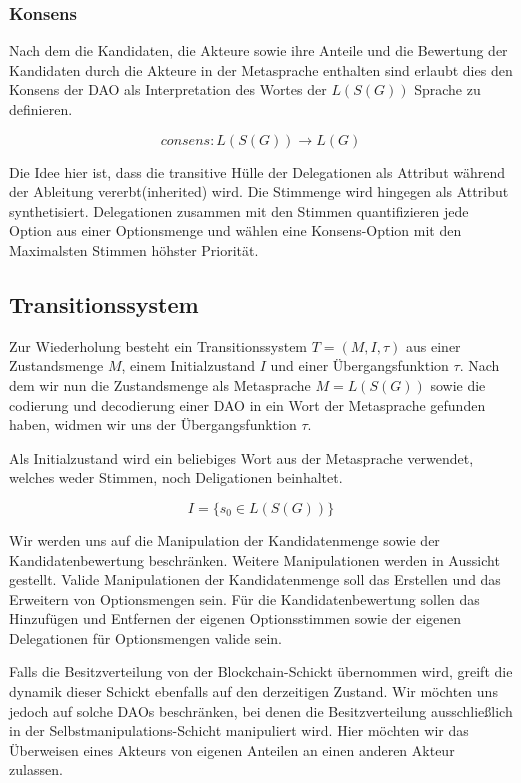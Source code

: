 \documentclass[a4paper,12pt]{article}
\begin{document}
\subsubsection*{Konsens}

Nach dem die Kandidaten, die Akteure sowie ihre Anteile und die Bewertung der Kandidaten durch die Akteure in der Metasprache enthalten sind erlaubt dies den Konsens der DAO als Interpretation des Wortes der $L(S(G))$ Sprache zu definieren. 

\[ consens: L(S(G)) \rightarrow L(G) \] 

Die Idee hier ist, dass die transitive Hülle der Delegationen als
Attribut während der Ableitung vererbt(inherited) wird. Die Stimmenge 
wird hingegen als Attribut synthetisiert.\cite{Knuth1968} Delegationen zusammen mit den Stimmen quantifizieren jede Option aus einer Optionsmenge und wählen
eine Konsens-Option mit den Maximalsten Stimmen höhster Priorität.



\subsection{Transitionssystem}

Zur Wiederholung besteht ein Transitionssystem $T=(M,I,\tau)$ aus einer Zustandsmenge $M$, einem Initialzustand $I$ und einer Übergangsfunktion $\tau$.
Nach dem wir nun die Zustandsmenge als Metasprache $M=L(S(G))$ sowie die codierung und decodierung einer DAO in ein Wort der Metasprache gefunden haben, widmen wir uns der Übergangsfunktion $\tau$.

Als Initialzustand wird ein beliebiges Wort aus der Metasprache verwendet, welches weder Stimmen, noch Deligationen beinhaltet.

\[ I = \{s_0\in L(S(G))\} \] 

Wir werden uns auf die Manipulation der Kandidatenmenge sowie der Kandidatenbewertung beschränken. Weitere Manipulationen werden in Aussicht gestellt. Valide Manipulationen der Kandidatenmenge soll das Erstellen und das Erweitern von Optionsmengen sein. Für die Kandidatenbewertung sollen das Hinzufügen und Entfernen der eigenen Optionsstimmen sowie der eigenen Delegationen für Optionsmengen valide sein. 

Falls die Besitzverteilung von der Blockchain-Schickt übernommen wird, greift die dynamik dieser Schickt ebenfalls auf den derzeitigen Zustand. Wir möchten uns jedoch auf solche DAOs beschränken, bei denen die Besitzverteilung ausschließlich in der Selbstmanipulations-Schicht manipuliert wird. Hier möchten wir das Überweisen eines Akteurs von eigenen Anteilen an einen anderen Akteur zulassen.
\end{document}
